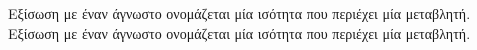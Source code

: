 Εξίσωση με έναν άγνωστο ονομάζεται μία ισότητα που περιέχει μία μεταβλητή.
Εξίσωση με έναν άγνωστο ονομάζεται μία ισότητα που περιέχει μία μεταβλητή.
